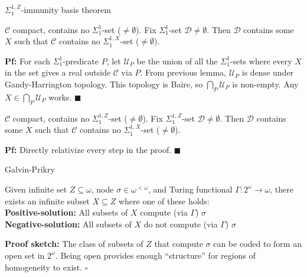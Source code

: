 \begin{frame}{$\Sigma_1^{1,Z}$-immunity basis theorem}
  \begin{thm*}
    $\mathcal{C}$ compact, contains no $\Sigma_1^{1}$-set
    ($\neq\emptyset$). Fix $\Sigma_1^{1}$-set
    $\mathcal{D}\neq\emptyset$. Then $\mathcal{D}$ contains some $X$ such
    that $\mathcal{C}$ contains no $\Sigma_1^{1,X}$-set ($\neq\emptyset$).
  \end{thm*}
  \textbf{Pf:} For each $\Sigma_1^{1}$-predicate $P$, let $\mathcal{U}_P$
  be the union of all the $\Sigma_1^{1}$-sets where every $X$ in the set
  gives a real outside $\mathcal{C}$ via $P$. From previous lemma,
  $\mathcal{U}_P$ is dense under Gandy-Harrington topology. This topology
  is Baire, so $\bigcap_P\mathcal{U}_P$ is non-empty. Any
  $X\in\bigcap_P\mathcal{U}_P$ works. $\blacksquare$

  \vspace{0.5em}
  \begin{coro*}
    $\mathcal{C}$ compact, contains no $\Sigma_1^{1,Z}$-set
    ($\neq\emptyset$). Fix $\Sigma_1^{1,Z}$-set
    $\mathcal{D}\neq\emptyset$. Then $\mathcal{D}$ contains some $X$ such
    that $\mathcal{C}$ contains no $\Sigma_1^{1,X}$-set ($\neq\emptyset$).
  \end{coro*}
  \textbf{Pf:} Directly relativize every step in the proof.
  $\blacksquare$
\end{frame}

\begin{frame}{Galvin-Prikry}
  \begin{fact*}
    Given infinite set $Z\subseteq\omega$, node $\sigma\in\omega^{<\omega}$,
    and Turing functional $\Gamma:2^\omega\rightarrow\omega$, there exists
    an infinite subset $X\subseteq Z$ where one of these holds:\\

    \vspace{1em}
    \textbf{Positive-solution:} All subsets of $X$ compute (via $\Gamma$)
    $\sigma$ \\
    \textbf{Negative-solution:} All subsets of $X$ do not compute (via
    $\Gamma$) $\sigma$
  \end{fact*}

  \vspace{1em}
  \textbf{Proof sketch:} The class of subsets of $Z$ that
  compute $\sigma$ can be coded to form an open set in $2^\omega$. Being
  open provides enough ``structure'' for regions of homogeneity to exist.
  $\square$
\end{frame}
